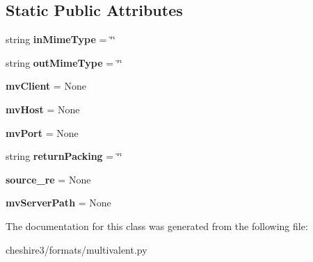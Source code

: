 \subsection*{Static Public Attributes}
\begin{DoxyCompactItemize}
\item 
\hypertarget{classcheshire3_1_1formats_1_1multivalent_1_1_multivalent_pre_parser_a66d178aa9cb37c1c8826038c28dc3b5a}{string {\bfseries in\-Mime\-Type} = \char`\"{}\char`\"{}}\label{classcheshire3_1_1formats_1_1multivalent_1_1_multivalent_pre_parser_a66d178aa9cb37c1c8826038c28dc3b5a}

\item 
\hypertarget{classcheshire3_1_1formats_1_1multivalent_1_1_multivalent_pre_parser_a2484cfd915e06d618516ab8334a87c72}{string {\bfseries out\-Mime\-Type} = \char`\"{}\char`\"{}}\label{classcheshire3_1_1formats_1_1multivalent_1_1_multivalent_pre_parser_a2484cfd915e06d618516ab8334a87c72}

\item 
\hypertarget{classcheshire3_1_1formats_1_1multivalent_1_1_multivalent_pre_parser_a4da587d61f66bc6b15ef4602f3503df4}{{\bfseries mv\-Client} = None}\label{classcheshire3_1_1formats_1_1multivalent_1_1_multivalent_pre_parser_a4da587d61f66bc6b15ef4602f3503df4}

\item 
\hypertarget{classcheshire3_1_1formats_1_1multivalent_1_1_multivalent_pre_parser_a9392bf8be08cc2a2e0bec8315e297c53}{{\bfseries mv\-Host} = None}\label{classcheshire3_1_1formats_1_1multivalent_1_1_multivalent_pre_parser_a9392bf8be08cc2a2e0bec8315e297c53}

\item 
\hypertarget{classcheshire3_1_1formats_1_1multivalent_1_1_multivalent_pre_parser_ae8122ed727511d7ae583416bac639860}{{\bfseries mv\-Port} = None}\label{classcheshire3_1_1formats_1_1multivalent_1_1_multivalent_pre_parser_ae8122ed727511d7ae583416bac639860}

\item 
\hypertarget{classcheshire3_1_1formats_1_1multivalent_1_1_multivalent_pre_parser_a03fcc7a0abd583d45af937a8d45d4c13}{string {\bfseries return\-Packing} = \char`\"{}\char`\"{}}\label{classcheshire3_1_1formats_1_1multivalent_1_1_multivalent_pre_parser_a03fcc7a0abd583d45af937a8d45d4c13}

\item 
\hypertarget{classcheshire3_1_1formats_1_1multivalent_1_1_multivalent_pre_parser_a150d66fa40284b859c49e8b3d18d41c3}{{\bfseries source\-\_\-re} = None}\label{classcheshire3_1_1formats_1_1multivalent_1_1_multivalent_pre_parser_a150d66fa40284b859c49e8b3d18d41c3}

\item 
\hypertarget{classcheshire3_1_1formats_1_1multivalent_1_1_multivalent_pre_parser_a25292149f1cd23bc888ef7733039edb1}{{\bfseries mv\-Server\-Path} = None}\label{classcheshire3_1_1formats_1_1multivalent_1_1_multivalent_pre_parser_a25292149f1cd23bc888ef7733039edb1}

\end{DoxyCompactItemize}


The documentation for this class was generated from the following file\-:\begin{DoxyCompactItemize}
\item 
cheshire3/formats/multivalent.\-py\end{DoxyCompactItemize}
